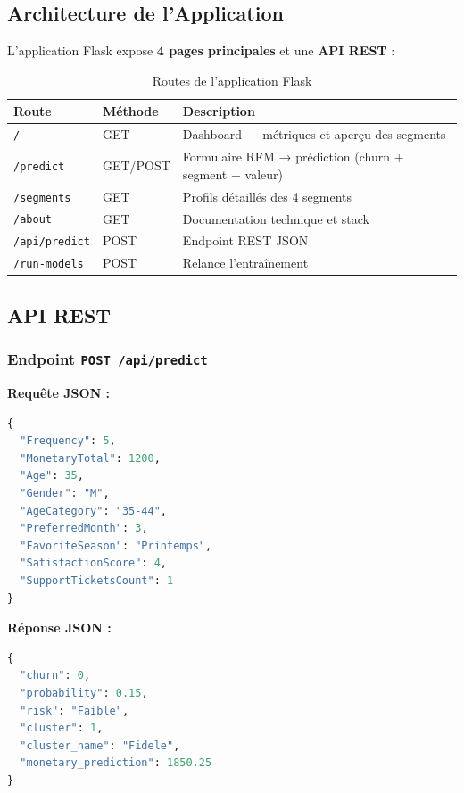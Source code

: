 \documentclass[12pt,a4paper]{article}
\begin{document}
\subsection{Architecture de l'Application}

L'application Flask expose \textbf{4 pages principales} et une \textbf{API REST} :

\begin{table}[H]
\centering
\caption{Routes de l'application Flask}
\begin{tabular}{lll}
\toprule
\textbf{Route} & \textbf{Méthode} & \textbf{Description} \\
\midrule
\texttt{/}           & GET      & Dashboard — métriques et aperçu des segments \\
\texttt{/predict}    & GET/POST & Formulaire RFM → prédiction (churn + segment + valeur) \\
\texttt{/segments}   & GET      & Profils détaillés des 4 segments \\
\texttt{/about}      & GET      & Documentation technique et stack \\
\texttt{/api/predict}& POST     & Endpoint REST JSON \\
\texttt{/run-models} & POST     & Relance l'entraînement \\
\bottomrule
\end{tabular}
\end{table}

\subsection{API REST}

\subsubsection{Endpoint \texttt{POST /api/predict}}

\textbf{Requête JSON :}
\begin{lstlisting}[language=Python, caption=Exemple de requête API]
{
  "Frequency": 5,
  "MonetaryTotal": 1200,
  "Age": 35,
  "Gender": "M",
  "AgeCategory": "35-44",
  "PreferredMonth": 3,
  "FavoriteSeason": "Printemps",
  "SatisfactionScore": 4,
  "SupportTicketsCount": 1
}
\end{lstlisting}

\textbf{Réponse JSON :}
\begin{lstlisting}[language=Python, caption=Exemple de réponse API]
{
  "churn": 0,
  "probability": 0.15,
  "risk": "Faible",
  "cluster": 1,
  "cluster_name": "Fidele",
  "monetary_prediction": 1850.25
}
\end{lstlisting}
\end{document}
